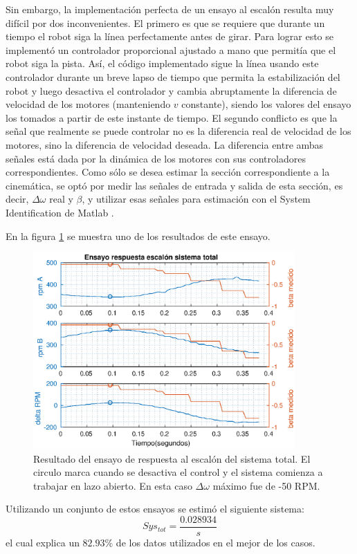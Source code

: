 \documentclass[10pt,conference,a4paper,onecolumn]{article}%
\begin{document}
Sin embargo, la implementación perfecta de un ensayo al escalón resulta muy difícil por dos inconvenientes. El primero es que se requiere que durante un tiempo el robot siga la línea perfectamente antes de girar. Para lograr esto se implementó un controlador proporcional ajustado a mano que permitía que el robot siga la pista. Así, el código implementado sigue la línea usando este controlador durante un breve lapso de tiempo que permita la estabilización del robot y luego desactiva el controlador y cambia abruptamente la diferencia de velocidad de los motores (manteniendo $v$ constante), siendo los valores del ensayo los tomados a partir de este instante de tiempo.
El segundo conflicto es que la señal que realmente se puede controlar no es la diferencia real de velocidad de los motores, sino la diferencia de velocidad deseada. La diferencia entre ambas señales está dada por la dinámica de los motores con sus controladores correspondientes. Como sólo se desea estimar la sección correspondiente a la cinemática, se optó por medir las señales de entrada y salida de esta sección, es decir, $\Delta \omega$ real y $\beta$, y utilizar esas señales para estimación con el System Identification de Matlab \cite{Sys_ident} . %

En la figura \ref{fig:ensayoSistTotal} se muestra uno de los resultados de este ensayo.
\begin{figure}
\centering
\includegraphics[width=10cm]{./imagenes/resp_escalon_sys_total}
\caption{Resultado del ensayo de respuesta al escalón del sistema total. El circulo marca cuando se desactiva el control y el sistema comienza a trabajar en lazo abierto. En esta caso $\Delta \omega$ máximo fue de -50 RPM.}
\label{fig:ensayoSistTotal}
\end{figure}
Utilizando un conjunto de estos ensayos se estimó el siguiente sistema:
\begin{equation}
Sys_{tot}= \frac{0.028934}{s}  
\label{eq:sys_tot_est}
\end{equation}
el cual explica un $82.93\%$ de los datos utilizados en el mejor de los casos.
\end{document}
